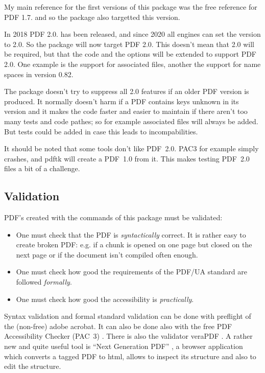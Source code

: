 \documentclass[DIV=12,parskip=half-,bibliography=totoc]{scrartcl}
\newcommand\PDF{PDF}
\begin{document}
My main reference for the first versions of this package
was the free reference for \PDF{} 1.7. \parencite{pdfreference} and so the package also targetted this version.

In 2018 \PDF{} 2.0. has been released, and since 2020 all engines can set the version to 2.0. So the package will
now target \PDF{} 2.0. This doesn't mean that 2.0 will be required, but that the code and the options will be extended to
support \PDF{} 2.0. One example is the support for associated files, another the support for name spaces in version 0.82.

The package doesn't try to suppress all 2.0 features if an older \PDF{} version is produced. It normally doesn't harm if a \PDF{} contains keys unknown in its version and it makes the code faster and easier to maintain if there aren't too many tests and code pathes; so for example associated files will always be added. But tests could be added in case this leads to incompabilities.

It should be noted that some tools don't like \PDF{}~2.0.  PAC3 for example simply crashes, and pdftk will create a \PDF{}~1.0 from it. This makes testing \PDF{}~2.0 files a bit of a challenge.

\subsection{Validation}


\PDF{}'s created with the commands of this package must be validated:

\begin{itemize}
\item
 One must check that the \PDF{} is \emph{syntactically} correct. It is rather easy to create broken \PDF{}:
 e.g. if a chunk is opened on one page but closed on the next page or if the document isn't compiled often enough.

\item
One must check how good the requirements of the PDF/UA standard are followed \emph{formally}.

\item
One must check how good the accessibility is \emph{practically}.
\end{itemize}


Syntax validation and formal standard validation can be done with preflight of the (non-free) adobe acrobat.
It can also be done also with the free \PDF{} Accessibility Checker (PAC~3) \parencite{pac3}.
There is also the validator veraPDF \parencite{verapdf}.
A rather new and quite useful tool is \enquote{Next Generation PDF} \parencite{ngpdf}, a browser application which converts a tagged PDF to html, allows to inspect its structure and also to edit the structure.
\end{document}
